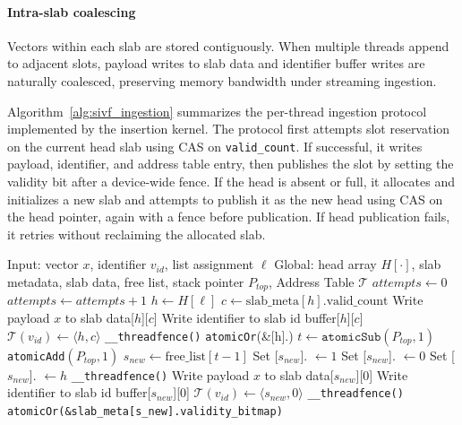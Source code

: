 \documentclass[sigconf,nonacm]{acmart}
\theoremstyle{plain}
\theoremstyle{definition}
\theoremstyle{remark}
\begin{document}
\paragraph{Intra-slab coalescing}
Vectors within each slab are stored contiguously. When multiple threads append to adjacent slots, payload writes to slab data and identifier buffer writes are naturally coalesced, preserving memory bandwidth under streaming ingestion.

Algorithm~\ref{alg:sivf_ingestion} summarizes the per-thread ingestion protocol implemented by the insertion kernel. The protocol first attempts slot reservation on the current head slab using CAS on \texttt{valid\_count}. If successful, it writes payload, identifier, and address table entry, then publishes the slot by setting the validity bit after a device-wide fence. If the head is absent or full, it allocates and initializes a new slab and attempts to publish it as the new head using CAS on the head pointer, again with a fence before publication. If head publication fails, it retries without reclaiming the allocated slab.

\begin{algorithm}[t]
\caption{Lock-free ingestion protocol in SIVF}
\label{alg:sivf_ingestion}
\begin{algorithmic}[1]
\State Input: vector $x$, identifier $v_{id}$, list assignment $\ell$
\State Global: head array $H[\cdot]$, slab metadata, slab data, free list, stack pointer $P_{top}$, Address Table $\mathcal{T}$
\State $attempts \gets 0$
    \State $attempts \gets attempts + 1$
    \State $h \gets H[\ell]$
        \State $c \gets \text{slab\_meta}[h].\text{valid\_count}$
                \State Write payload $x$ to slab data[$h$][$c$]
                \State Write identifier to slab id buffer[$h$][$c$]
                \State $\mathcal{T}(v_{id}) \gets \langle h, c \rangle$
                \State \verb|__threadfence()|
                \State \texttt{atomicOr}(\&[h].)
                \State \Return
            \EndIf
        \EndIf
    \EndIf
    \State $t \gets \texttt{atomicSub}(P_{top}, 1)$
        \State \texttt{atomicAdd}$(P_{top}, 1)$
        \State \Return
    \EndIf
    \State $s_{new} \gets \text{free\_list}[t-1]$
    \State Set [$s_{new}$]. $\gets 1$
    \State Set [$s_{new}$]. $\gets 0$
    \State Set [$s_{new}$]. $\gets h$
    \State \verb|__threadfence()|
        \State Write payload $x$ to slab data[$s_{new}$][$0$]
        \State Write identifier to slab id buffer[$s_{new}$][$0$]
        \State $\mathcal{T}(v_{id}) \gets \langle s_{new}, 0 \rangle$
        \State \verb|__threadfence()|
        \State \texttt{atomicOr(\&slab\_meta[s\_new].validity\_bitmap)}
        \State \Return
    \EndIf
\EndWhile
\end{algorithmic}
\end{algorithm}
\end{document}
